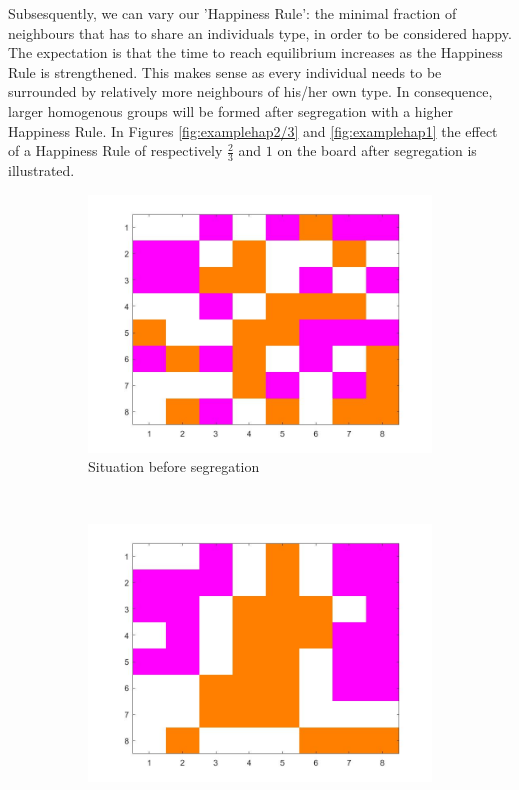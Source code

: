 Subsesquently, we can vary our 'Happiness Rule': the minimal fraction of neighbours that has to share an individuals type, in order to be considered happy.
The expectation is that the time to reach equilibrium increases as the Happiness Rule is strengthened.
This makes sense as every individual needs to be surrounded by relatively more neighbours of his/her own type.
In consequence, larger homogenous groups will be formed after segregation with a higher Happiness Rule.
In Figures \ref{fig:examplehap2/3} and \ref{fig:examplehap1} the effect of a Happiness Rule of respectively $\frac{2}{3}$ and $1$ on the board after segregation is illustrated.
\vspace{-10pt}
\begin{figure}[H]
	\centering
    \begin{subfigure}{0.4\textwidth}
        \includegraphics[width=\textwidth]{vb3beginbord.jpg}
        \caption{Situation before segregation}
        \label{fig:example hap 2/3 begin}
    \end{subfigure}\hspace{0cm}
    ~ 
    \begin{subfigure}{0.4\textwidth}
        \includegraphics[width=\textwidth]{vb3eindbord.jpg}

\end{subfigure}
\end{figure}
